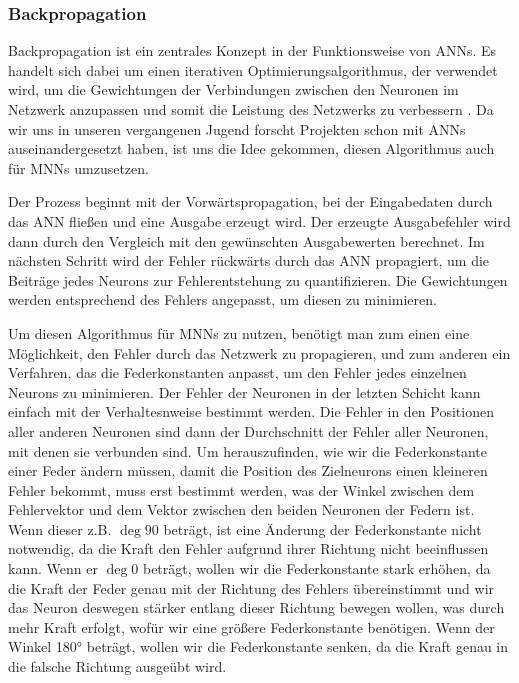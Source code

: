 \documentclass[10pt]{scrartcl}
\begin{document}
\subsubsection{Backpropagation}

Backpropagation ist ein zentrales Konzept in der Funktionsweise von ANNs.
Es handelt sich dabei um einen iterativen Optimierungsalgorithmus, der verwendet wird, um die Gewichtungen der Verbindungen zwischen den Neuronen im Netzwerk anzupassen und somit die Leistung des Netzwerks zu verbessern \cite{brotcrunsher:backwardpass}. Da wir uns in unseren vergangenen Jugend forscht Projekten schon mit ANNs auseinandergesetzt haben, ist uns die Idee gekommen, diesen Algorithmus auch für MNNs umzusetzen.

Der Prozess beginnt mit der Vorwärtspropagation, bei der Eingabedaten durch das ANN fließen und eine Ausgabe erzeugt wird. Der erzeugte Ausgabefehler wird dann durch den Vergleich mit den gewünschten Ausgabewerten berechnet. Im nächsten Schritt wird der Fehler rückwärts durch das ANN propagiert, um die Beiträge jedes Neurons zur Fehlerentstehung zu quantifizieren.
Die Gewichtungen werden entsprechend des Fehlers angepasst, um diesen zu minimieren.

Um diesen Algorithmus für MNNs zu nutzen, benötigt man zum einen eine Möglichkeit, den Fehler durch das Netzwerk zu propagieren, und zum anderen ein Verfahren, das die Federkonstanten anpasst, um den Fehler jedes einzelnen Neurons zu minimieren.
Der Fehler der Neuronen in der letzten Schicht kann einfach mit der Verhaltesnweise bestimmt werden. Die Fehler in den Positionen aller anderen Neuronen sind dann der Durchschnitt der Fehler aller Neuronen, mit denen sie verbunden sind. Um herauszufinden, wie wir die Federkonstante einer Feder ändern müssen, damit die Position des Zielneurons einen kleineren Fehler bekommt, muss erst bestimmt werden, was der Winkel zwischen dem Fehlervektor und dem Vektor zwischen den beiden Neuronen der Federn ist. Wenn dieser z.B. $\deg{90}$ beträgt, ist eine Änderung der Federkonstante nicht notwendig, da die Kraft den Fehler aufgrund ihrer Richtung nicht beeinflussen kann. Wenn er $\deg{0}$ beträgt, wollen wir die Federkonstante stark erhöhen, da die Kraft der Feder genau mit der Richtung des Fehlers übereinstimmt und wir das Neuron deswegen stärker entlang dieser Richtung bewegen wollen, was durch mehr Kraft erfolgt, wofür wir eine größere Federkonstante benötigen. Wenn der Winkel 180° beträgt, wollen wir die Federkonstante senken, da die Kraft genau in die falsche Richtung ausgeübt wird.
\end{document}
